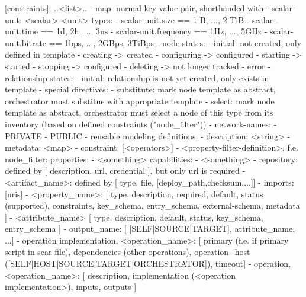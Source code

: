             [constraints]: ..<list>..
      - map: normal key-value pair, shorthanded with {}
      - scalar-unit: <scalar> <unit> %
        types:
        - scalar-unit.size == 1 B, ..., 2 TiB
        - scalar-unit.time == 1d, 2h, ..., 3ns
        - scalar-unit.frequency == 1Hz, ..., 5GHz
        - scalar-unit.bitrate == 1bps, ..., 2GBps, 3TiBps
      - node-states:
        - initial: not created, only defined in template
        - creating -> created
        - configuring -> configured
        - starting -> started
        - stopping -> configured
        - deleting -> not longer tracked
        - error
      - relationship-states: %
        - initial: relationship is not yet created, only exists in template
      - special directives:
        - substitute: mark node template as abstract, orchestrator must substitue with appropriate template
        - select: mark node template as abstract, orchestrator must select a node of this type from its inventory (based on defined constraints ("node_filter"))
      - network-names: %
        - PRIVATE
        - PUBLIC
    - reusable modeling definitions:
      - description: <string>
      - metadata: <map>
      - constraint: [<operators>] %
      - <property-filter-definition>, f.e. %
        node_filter:
          properties:
            - <something>
          capabilities: %
            - <something>
      - repository: defined by [ description, url, credential ], but only url is required
      - <artifact_name>: defined by [ type, file, [deploy_path,checksum,...]] %
      - imports: [uris] %
      - <property_name>: [ type, description, required, default, status (supported), constraints, key_schema, entry_schema, external-schema, metadata ]
      - <attribute_name> [ type, description, default, status, key_schema, entry_schema ]
      - output_name: [ [SELF|SOURCE|TARGET], attribute_name, ...] %
      - operation implementation, <operation_name>: [ primary (f.e. if primary script in scar file), dependencies (other operations), operation_host ([SELF|HOST|SOURCE|TARGET|ORCHESTRATOR]), timeout] 
      - operation, <operation_name>: [ description, implementation (<operation implementation>), inputs, outputs ] %
